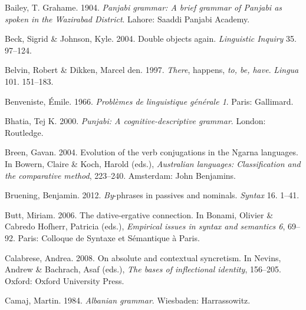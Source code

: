 \documentclass[output=paper]{langsci/langscibook}
\begin{document}
\begin{styleSfondomedioiColorexi}
Bailey, T. Grahame. 1904. \textit{Panjabi grammar: A brief grammar of Panjabi as spoken in the Wazirabad District}. Lahore: Saaddi Panjabi Academy.
\end{styleSfondomedioiColorexi}

\begin{styleSfondomedioiColorexi}
Beck, Sigrid \& Johnson, Kyle. 2004. Double objects again. \textit{Linguistic Inquiry} 35. 97–124.
\end{styleSfondomedioiColorexi}

\begin{styleSfondomedioiColorexi}
Belvin, Robert \& Dikken, Marcel den. 1997. \textit{There}, happens, \textit{to, be, have}. \textit{Lingua} 101. 151–183.
\end{styleSfondomedioiColorexi}

Benveniste, Émile. 1966. \textit{Problèmes de linguistique générale 1}. Paris: Gallimard.

Bhatia, Tej K. 2000. \textit{Punjabi: A cognitive-descriptive grammar}. London: Routledge. 

\begin{styleSfondomedioiColorexi}
Breen, Gavan. 2004. Evolution of the verb conjugations in the Ngarna languages. In Bowern, Claire \& Koch, Harold (eds.), \textit{Australian languages: Classification and the comparative method}, 223–240. Amsterdam: John Benjamins.
\end{styleSfondomedioiColorexi}

Bruening, Benjamin. 2012. \textit{By}{}-phrases in passives and nominals. \textit{Syntax} 16. 1–41.

Butt, Miriam. 2006. The dative-ergative connection. In Bonami, Olivier \& Cabredo Hofherr, Patricia (eds.), \textit{Empirical issues in syntax and semantics 6}, 69–92. Paris: Colloque de Syntaxe et Sémantique à Paris. 

\begin{styleSfondomedioiColorexi}
Calabrese, Andrea. 2008. On absolute and contextual syncretism. In Nevins, Andrew \& Bachrach, Asaf (eds.), \textit{The bases of inflectional identity}, 156–205. Oxford: Oxford University Press.
\end{styleSfondomedioiColorexi}

\begin{styleSfondomedioiColorexi}
Camaj, Martin. 1984. \textit{Albanian grammar}. Wiesbaden: Harrassowitz.
\end{styleSfondomedioiColorexi}
\end{document}

